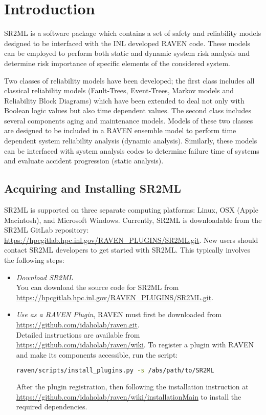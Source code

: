 \section{Introduction}
\label{sec:Introduction}

SR2ML is a software package which contains a set of safety and reliability models
designed to be interfaced with the INL developed RAVEN code. These models can be
employed to perform both static and dynamic system risk analysis and determine
risk importance of specific elements of the considered system.

Two classes of reliability models have been developed; the first class includes
all classical reliability models (Fault-Trees, Event-Trees, Markov models and
Reliability Block Diagrams) which have been extended to deal not only with
Boolean logic values but also time dependent values. The second class includes
several components aging and maintenance models. Models of these two classes are designed to
be included in a RAVEN ensemble model to perform time dependent system reliability
analysis (dynamic analysis). Similarly, these models can be interfaced with system
analysis codes  to determine failure time of systems and evaluate accident progression
(static analysis).

\subsection{Acquiring and Installing SR2ML}
SR2ML is supported on three separate computing platforms: Linux, OSX (Apple Macintosh), and Microsoft
Windows. Currently, SR2ML is downloadable from the SR2ML GitLab repository:
\url{https://hpcgitlab.hpc.inl.gov/RAVEN_PLUGINS/SR2ML.git}. New users should contact SR2ML developers to
get started with SR2ML. This typically involves the following steps:

\begin{itemize}
  \item \textit{Download SR2ML}
    \\ You can download the source code for SR2ML from \url{https://hpcgitlab.hpc.inl.gov/RAVEN_PLUGINS/SR2ML.git}.
	\item \textit{Use as a RAVEN Plugin}, RAVEN must first be downloaded from
  \url{https://github.com/idaholab/raven.git}.
		\\ Detailed instructions are available from \url{https://github.com/idaholab/raven/wiki}.
    To register a plugin with RAVEN and make its components accessible, run the script:
    \begin{lstlisting}[language=bash]
  	raven/scripts/install_plugins.py -s /abs/path/to/SR2ML
  	\end{lstlisting}
    After the plugin registration, then following the installation instruction at
    \url{https://github.com/idaholab/raven/wiki/installationMain} to install the
    required dependencies.
\end{itemize}

